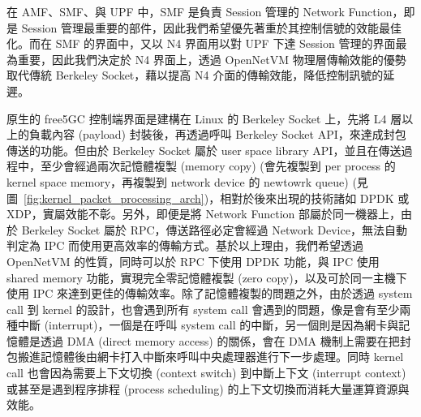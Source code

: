 在 AMF、SMF、與 UPF 中，SMF 是負責 Session 管理的 Network Function，即是 Session 管理最重要的部件，因此我們希望優先著重於其控制信號的效能最佳化。而在 SMF 的界面中，又以 N4 界面用以對 UPF 下達 Session 管理的界面最為重要，因此我們決定於 N4 界面上，透過 OpenNetVM 物理層傳輸效能的優勢取代傳統 Berkeley Socket，藉以提高 N4 介面的傳輸效能，降低控制訊號的延遲。


原生的 free5GC 控制端界面是建構在 Linux 的 Berkeley Socket 上，先將 L4 層以上的負載內容 (payload) 封裝後，再透過呼叫 Berkeley Socket API，來達成封包傳送的功能。但由於 Berkeley Socket 屬於 user space library API，並且在傳送過程中，至少會經過兩次記憶體複製 (memory copy) (會先複製到 per process 的 kernel space memory，再複製到 network device 的 newtowrk queue) (見圖~\ref{fig:kernel_packet_processing_arch})，相對於後來出現的技術諸如 DPDK 或 XDP，實屬效能不彰。另外，即便是將 Network Function 部屬於同一機器上，由於 Berkeley Socket 屬於 RPC，傳送路徑必定會經過 Network Device，無法自動判定為 IPC 而使用更高效率的傳輸方式。基於以上理由，我們希望透過 OpenNetVM 的性質，同時可以於 RPC 下使用 DPDK 功能，與 IPC 使用 shared memory 功能，實現完全零記憶體複製 (zero copy)，以及可於同一主機下使用 IPC 來達到更佳的傳輸效率。除了記憶體複製的問題之外，由於透過 system call 到 kernel 的設計，也會遇到所有 system call 會遇到的問題，像是會有至少兩種中斷 (interrupt)，一個是在呼叫 system call 的中斷，另一個則是因為網卡與記憶體是透過 DMA (direct memory access) 的關係，會在 DMA 機制上需要在把封包搬進記憶體後由網卡打入中斷來呼叫中央處理器進行下一步處理。同時 kernel call 也會因為需要上下文切換 (context switch) 到中斷上下文 (interrupt context) 或甚至是遇到程序排程 (process scheduling) 的上下文切換而消耗大量運算資源與效能。

